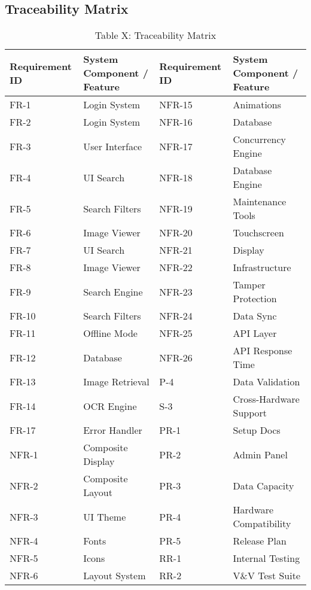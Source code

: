 \documentclass[12pt]{article}
\begin{document}
\begin{portrait}
    
\section{Traceability Matrix}
\begin{table}[H]
\centering
\caption{Table X: Traceability Matrix}
\renewcommand{\arraystretch}{1.2}
\begin{adjustbox}{max width=\linewidth}
\begin{tabular}{|l|l||l|l|}
\hline
\textbf{Requirement ID} & \textbf{System Component / Feature} & \textbf{Requirement ID} & \textbf{System Component / Feature} \\
\hline
FR-1 & Login System & NFR-15 & Animations \\
FR-2 & Login System & NFR-16 & Database \\
FR-3 & User Interface & NFR-17 & Concurrency Engine \\
FR-4 & UI Search & NFR-18 & Database Engine \\
FR-5 & Search Filters & NFR-19 & Maintenance Tools \\
FR-6 & Image Viewer & NFR-20 & Touchscreen \\
FR-7 & UI Search & NFR-21 & Display \\
FR-8 & Image Viewer & NFR-22 & Infrastructure \\
FR-9 & Search Engine & NFR-23 & Tamper Protection \\
FR-10 & Search Filters & NFR-24 & Data Sync \\
FR-11 & Offline Mode & NFR-25 & API Layer \\
FR-12 & Database & NFR-26 & API Response Time \\
FR-13 & Image Retrieval & P-4 & Data Validation \\
FR-14 & OCR Engine & S-3 & Cross-Hardware Support \\
FR-17 & Error Handler & PR-1 & Setup Docs \\
NFR-1 & Composite Display & PR-2 & Admin Panel \\
NFR-2 & Composite Layout & PR-3 & Data Capacity \\
NFR-3 & UI Theme & PR-4 & Hardware Compatibility \\
NFR-4 & Fonts & PR-5 & Release Plan \\
NFR-5 & Icons & RR-1 & Internal Testing \\
NFR-6 & Layout System & RR-2 & V\&V Test Suite \\

\end{tabular}
\end{adjustbox}
\end{table}
\end{portrait}
\end{document}
